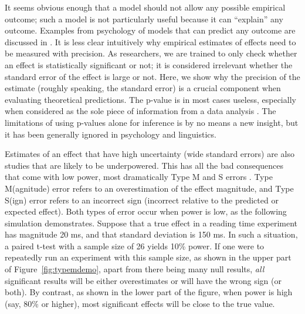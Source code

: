 \documentclass{cambridge7A}\usepackage[]{graphicx}\usepackage[]{color}
\begin{document}
It seems obvious enough that a model should not allow any possible
empirical outcome; such a model is not particularly useful
because it can ``explain'' any outcome. Examples from psychology of models that can predict any outcome are discussed in \cite{rp}. 
It is less clear intuitively why
empirical estimates of effects need to be measured with precision. As
researchers, we are trained to only check whether an effect is
statistically significant or not; it is considered irrelevant whether 
the standard error of the effect is large or not. Here, we show why 
the precision of the estimate (roughly speaking, the standard error)
is a crucial component when evaluating theoretical predictions. The
p-value is in most cases useless, especially when considered as the
sole piece of information from a data analysis \citep{pvals}. The limitations of using p-values alone for inference is by no means a new insight, but it has been generally ignored in psychology and linguistics.

Estimates of an effect that have high uncertainty (wide standard
errors) are also studies that are likely to be underpowered.  This has
all the bad consequences that come with low power, most dramatically  
Type M and S errors \citep{GelmanCarlin2014}. Type M(agnitude) error
refers to an overestimation of the effect magnitude, and Type S(ign)
error refers to an incorrect sign (incorrect relative to the predicted
or expected effect). Both types of error occur when power is low, as 
the following simulation demonstrates.  Suppose that a true effect in
a reading time experiment has magnitude 20 ms, and that standard
deviation is 150 ms. In such a situation, a paired t-test with a 
sample size of 26 yields 10\% power. If one were to repeatedly run an
experiment with this sample size, as shown in the upper part of
Figure~\ref{fig:typemdemo}, apart from there being many null results, 
\textit{all} significant results will be either overestimates or will have the
wrong sign (or both). By contrast, as shown in the lower part of the
figure, when power is high (say, 80\% or higher), most significant
effects will be close to the true value.
\end{document}
